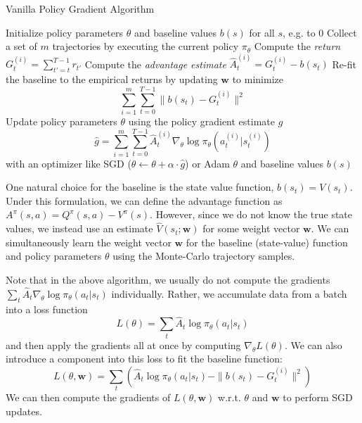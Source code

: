 \documentclass{article}
\newcommand{\w}{\mathbf{w}}
\begin{document}
\begin{algorithm}[H] %
\caption{Vanilla Policy Gradient Algorithm}\label{alg:policy_gradient}
\begin{algorithmic}[1]
\State Initialize policy parameters $\theta$ and baseline values $b(s)$ for all $s$, e.g. to 0
    \State Collect a set of $m$ trajectories by executing the current policy $\pi_\theta$
        \State Compute the \textit{return} $G_t^{(i)} = \sum_{t'=t}^{T-1} r_{t'}$
        \State Compute the \textit{advantage estimate} $\hat{A}_t^{(i)} = G_t^{(i)} - b(s_t)$
    \EndFor
    \State Re-fit the baseline to the empirical returns by updating $\w$ to minimize
        $$
        \sum_{i=1}^m \sum_{t=0}^{T-1} \| b(s_t) - G_t^{(i)} \|^2
        $$
    \State Update policy parameters $\theta$ using the policy gradient estimate $\hat{g}$
        $$
        \hat{g} = \sum_{i=1}^m \sum_{t=0}^{T-1} \hat{A}_t^{(i)} \nabla_\theta \log \pi_\theta(a_t^{(i)} | s_t^{(i)})
        $$
        \hspace{3em} with an optimizer like SGD ($\theta \gets \theta + \alpha \cdot \hat{g}$) or Adam
\EndFor
\Return $\theta$ and baseline values $b(s)$
\EndProcedure
\end{algorithmic}
\end{algorithm}

One natural choice for the baseline is the state value function, $b(s_t) = V(s_t)$. Under this formulation, we can define the advantage function as $A^\pi (s,a) = Q^\pi (s,a) - V^\pi (s)$. However, since we do not know the true state values, we instead use an estimate $\hat{V}(s_t; \w)$ for some weight vector $\w$. We can simultaneously learn the weight vector $\w$ for the baseline (state-value) function and policy parameters $\theta$ using the Monte-Carlo trajectory samples.

Note that in the above algorithm, we usually do not compute the gradients
$ \sum_t \hat{A}_t \nabla_\theta \log \pi_\theta(a_t | s_t) $ individually.
Rather, we accumulate data from a batch into a loss function
\[ L(\theta) = \sum_t \hat{A}_t \log \pi_\theta(a_t | s_t) \]
and then apply the gradients all at once by computing $\nabla_\theta L(\theta)$. We can also introduce a component into this loss to fit the baseline function:
\[ L(\theta, \w) = \sum_t \left( \hat{A}_t \log \pi_\theta(a_t | s_t) - \| b(s_t) - G_t^{(i)}\|^2 \right) \]
We can then compute the gradients of $L(\theta, \w)$ w.r.t. $\theta$ and $\w$ to perform SGD updates.
\end{document}
